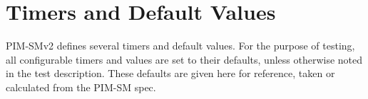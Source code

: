 \documentclass[11pt]{report}
\begin{document}
\section{Timers and Default Values}
PIM-SMv2 defines several timers and default values. For the purpose of
testing, all configurable timers and values are set to their defaults, unless
otherwise noted in the test description. These defaults are given here for
reference, taken or calculated from the PIM-SM spec.

%
%
\newcommand{\PimsmVersionDefault}{PIM-SMv2}	       %
\newcommand{\PimsmLanDelayDefault}{0.5 sec}		%
\newcommand{\PimsmTOverrideDefault}{2.5 sec}		%
\newcommand{\PimsmHelloPeriod}{30 sec}			%
\newcommand{\PimsmTriggeredHelloDelay}{5 sec}		%
\newcommand{\PimsmDefaultHelloHoldtime}{105 sec}       %
\newcommand{\PimsmHelloHoldtime}{105 sec}		%
\newcommand{\PimsmJPHoldTime}{210}			%
\newcommand{\PimsmJPOverrideIntervalI}{3 sec}	     %
\newcommand{\PimsmAssertOverrideInterval}{3 sec}     %
\newcommand{\PimsmAssertTime}{180 sec}			%
\newcommand{\PimsmTPeriodic}{60 sec}			%
\newcommand{\PimsmTSuppressed}{rand(66, 84) sec}	%
\newcommand{\PimsmTOverride}{rand(0, 2.5) sec}		%
\newcommand{\PimsmKeepalivePeriod}{210 sec}		%
\newcommand{\PimsmRPKeepalivePeriod}{185 sec}		%
\newcommand{\PimsmRegisterSuppressionTime}{60 sec}  %
\newcommand{\PimsmRegisterProbeTime}{5 sec}		%

%
%
\newcommand{\PimsmBSPeriod}{60 sec}			%
\newcommand{\PimsmBSTimeout}{130 sec}			%
\newcommand{\PimsmRandOverride}{weighted\_rand(5.0, 23.0) sec} %
\newcommand{\PimsmCRPTimeout}{150 sec}			%
\newcommand{\PimsmCRPAdvPeriod}{60 sec}			%
\newcommand{\PimsmSZTimeout}{1300 sec}			%
\end{document}
